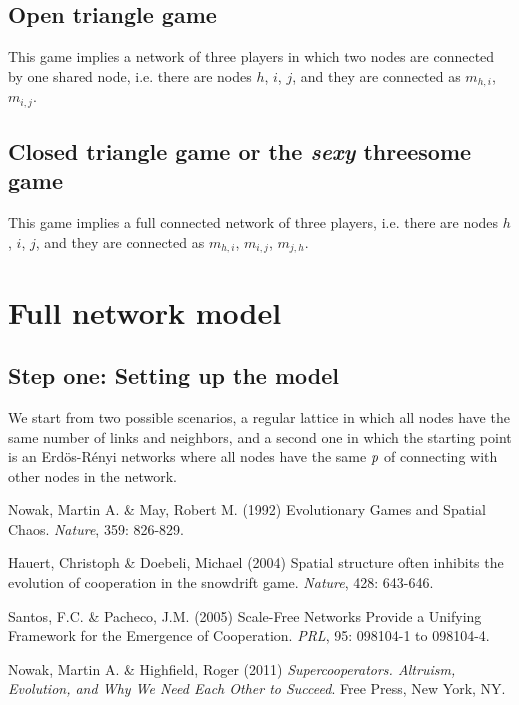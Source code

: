 \documentclass[11pt]{article}
\begin{document}
\subsection{Open triangle game}
This game implies a network of three players in which two nodes are connected by one shared node, i.e. there are nodes $h$, $i$, $j$, and they are connected as $m_{h,i}$, $m_{i,j}$.

\subsection{Closed triangle game or the \emph{sexy} threesome game}
This game implies a full connected network of three players, i.e. there are nodes $h$, $i$, $j$, and they are connected as $m_{h,i}$, $m_{i,j}$, $m_{j,h}$.

\section{Full network model}
\subsection{Step one: Setting up the model}

We start from two possible scenarios, a regular lattice in which all nodes have the
same number of links and neighbors, and a second one in which the
starting point is an Erd\"{o}s-R\'enyi networks where all nodes have the
same $\emph{p}$ of connecting with other nodes in the network.

\begin{thebibliography}{30}

 Nowak, Martin A. \& May, Robert M. (1992) Evolutionary Games and Spatial Chaos. \textit{Nature}, 359: 826-829.

 Hauert, Christoph \& Doebeli, Michael (2004) Spatial structure often inhibits the evolution of cooperation in the snowdrift game. \textit{Nature}, 428: 643-646.

 Santos, F.C. \& Pacheco, J.M. (2005) Scale-Free Networks Provide a Unifying Framework for the Emergence of Cooperation. \textit{PRL}, 95: 098104-1 to 098104-4.

 Nowak, Martin A. \& Highfield, Roger (2011) \textit{Supercooperators. Altruism, Evolution, and Why We Need Each Other to Succeed}. Free Press, New York, NY.

\end{thebibliography}
\end{document}
